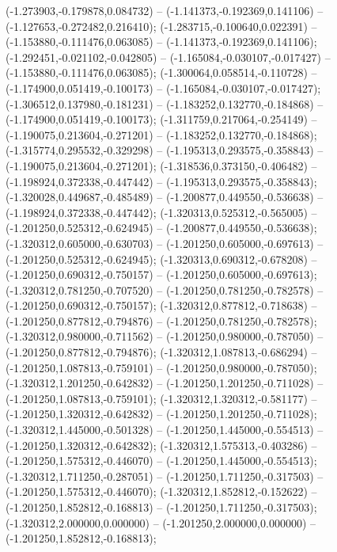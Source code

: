  (-1.273903,-0.179878,0.084732) -- (-1.141373,-0.192369,0.141106) -- (-1.127653,-0.272482,0.216410);
 (-1.283715,-0.100640,0.022391) -- (-1.153880,-0.111476,0.063085) -- (-1.141373,-0.192369,0.141106);
 (-1.292451,-0.021102,-0.042805) -- (-1.165084,-0.030107,-0.017427) -- (-1.153880,-0.111476,0.063085);
 (-1.300064,0.058514,-0.110728) -- (-1.174900,0.051419,-0.100173) -- (-1.165084,-0.030107,-0.017427);
 (-1.306512,0.137980,-0.181231) -- (-1.183252,0.132770,-0.184868) -- (-1.174900,0.051419,-0.100173);
 (-1.311759,0.217064,-0.254149) -- (-1.190075,0.213604,-0.271201) -- (-1.183252,0.132770,-0.184868);
 (-1.315774,0.295532,-0.329298) -- (-1.195313,0.293575,-0.358843) -- (-1.190075,0.213604,-0.271201);
 (-1.318536,0.373150,-0.406482) -- (-1.198924,0.372338,-0.447442) -- (-1.195313,0.293575,-0.358843);
 (-1.320028,0.449687,-0.485489) -- (-1.200877,0.449550,-0.536638) -- (-1.198924,0.372338,-0.447442);
 (-1.320313,0.525312,-0.565005) -- (-1.201250,0.525312,-0.624945) -- (-1.200877,0.449550,-0.536638);
 (-1.320312,0.605000,-0.630703) -- (-1.201250,0.605000,-0.697613) -- (-1.201250,0.525312,-0.624945);
 (-1.320313,0.690312,-0.678208) -- (-1.201250,0.690312,-0.750157) -- (-1.201250,0.605000,-0.697613);
 (-1.320312,0.781250,-0.707520) -- (-1.201250,0.781250,-0.782578) -- (-1.201250,0.690312,-0.750157);
 (-1.320312,0.877812,-0.718638) -- (-1.201250,0.877812,-0.794876) -- (-1.201250,0.781250,-0.782578);
 (-1.320312,0.980000,-0.711562) -- (-1.201250,0.980000,-0.787050) -- (-1.201250,0.877812,-0.794876);
 (-1.320312,1.087813,-0.686294) -- (-1.201250,1.087813,-0.759101) -- (-1.201250,0.980000,-0.787050);
 (-1.320312,1.201250,-0.642832) -- (-1.201250,1.201250,-0.711028) -- (-1.201250,1.087813,-0.759101);
 (-1.320312,1.320312,-0.581177) -- (-1.201250,1.320312,-0.642832) -- (-1.201250,1.201250,-0.711028);
 (-1.320312,1.445000,-0.501328) -- (-1.201250,1.445000,-0.554513) -- (-1.201250,1.320312,-0.642832);
 (-1.320312,1.575313,-0.403286) -- (-1.201250,1.575312,-0.446070) -- (-1.201250,1.445000,-0.554513);
 (-1.320312,1.711250,-0.287051) -- (-1.201250,1.711250,-0.317503) -- (-1.201250,1.575312,-0.446070);
 (-1.320312,1.852812,-0.152622) -- (-1.201250,1.852812,-0.168813) -- (-1.201250,1.711250,-0.317503);
 (-1.320312,2.000000,0.000000) -- (-1.201250,2.000000,0.000000) -- (-1.201250,1.852812,-0.168813);
